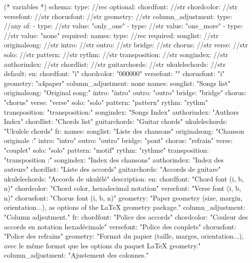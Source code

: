 (* variables *)
schema:
  type: //rec
  optional:
    chordfont: //str
    chordcolor: //str
    versefont: //str
    chorusfont: //str
    geometry: //str
    column_adjustment:
      type: //any
      of:
        - type: //str
          value: "only_one"
        - type: //str
          value: "one_more"
        - type: //str
          value: "none"
  required:
    names:
      type: //rec
      required:
        songlist: //str
        originalsong: //str
        intro: //str
        outro: //str
        bridge: //str
        chorus: //str
        verse: //str
        solo: //str
        pattern: //str
        rythm: //str
        transposition: //str
        songindex: //str
        authorindex: //str
        chordlist: //str
        guitarchords: //str
        ukulelechords: //str
default:
  en:
    chordfont: "i"
    chordcolor: "000000"
    versefont: ""
    chorusfont: "i"
    geometry: "a4paper"
    column_adjustment: none
    names:
      songlist: "Songs list"
      originalsong: "Original song:"
      intro: "intro"
      outro: "outro"
      bridge: "bridge"
      chorus: "chorus"
      verse: "verse"
      solo: "solo"
      pattern: "pattern"
      rythm: "rythm"
      transposition: "transposition:"
      songindex: "Songs Index"
      authorindex: "Authors Index"
      chordlist: "Chords list"
      guitarchords: "Guitar chords"
      ukulelechords: "Ukulele chords"
  fr:
    names:
      songlist: "Liste des chansons"
      originalsong: "Chanson originale :"
      intro: "intro"
      outro: "outro"
      bridge: "pont"
      chorus: "refrain"
      verse: "couplet"
      solo: "solo"
      pattern: "motif"
      rythm: "rythme"
      transposition: "transposition :"
      songindex: "Index des chansons"
      authorindex: "Index des auteurs"
      chordlist: "Liste des accords"
      guitarchords: "Accords de guitare"
      ukulelechords: "Accords de ukulélé"
description:
  en:
    chordfont: "Chord font (i, b, n)"
    chordcolor: "Chord color, hexadecimal notation"
    versefont: "Verse font (i, b, n)"
    chorusfont: "Chorus font (i, b, n)"
    geometry: "Paper geometry (size, margin, orientation...), as options of the LaTeX geometry package."
    column_adjustment: "Column adjsutment."
  fr:
    chordfont: "Police des accords"
    chordcolor: "Couleur des accords en notation hexadécimale"
    versefont: "Police des couplets"
    chorusfont: "Police des refrains"
    geometry: "Format du papier (taille, marges, orientation...), avec le même format que les options du paquet LaTeX geometry."
    column_adjustment: "Ajustement des colonnes."



